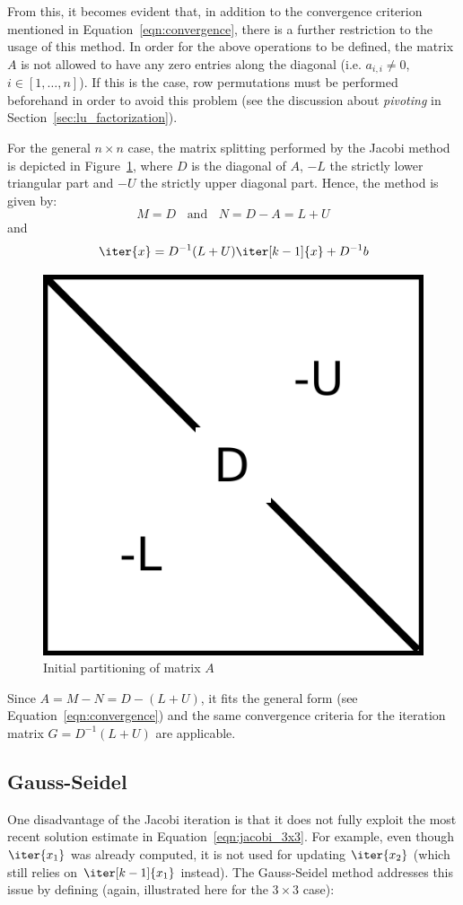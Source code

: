 \noindent From this, it becomes evident that, in addition to the convergence criterion mentioned in Equation~\hyperref[eqn:convergence]{\ref{eqn:convergence}}, there is a further restriction to the usage of this method. In order for the above operations to be defined, the matrix $A$ is not allowed to have any zero entries along the diagonal (i.e. $a_{i,i} \neq 0$, $i \in [1,\dots, n]$). If this is the case, row permutations must be performed beforehand in order to avoid this problem (see the discussion about \textit{pivoting} in Section~\hyperref[sec:lu_factorization]{\ref{sec:lu_factorization}}).

For the general $n \times n$ case, the matrix splitting performed by the Jacobi method is depicted in Figure~\hyperref[fig:splitting]{\ref{fig:splitting}}, where $D$ is the diagonal of $A$, $-L$ the strictly lower triangular part and $-U$ the strictly upper diagonal part. Hence, the method is given by:
\begin{equation}
    M=D \;\;\text{ and } \;\; N=D-A=L+U
\end{equation}
\noindent and
\begin{equation}
    \iter{x} = D^{-1}(L+U)\iter[k-1]{x} +D^{-1}b
\end{equation}

\begin{figure}[h]
    \centering
    \includegraphics[width=0.4\linewidth]{figures/Splitting.pdf}
    \caption[Matrix Splittings]{Initial partitioning of matrix $A$}
    \label{fig:splitting}
\end{figure}

\noindent Since $A = M -N = D - (L +U)$, it fits the general form (see Equation~\hyperref[eqn:convergence]{\ref{eqn:convergence}}) and the same convergence criteria for the iteration matrix $G=D^{-1}(L+U)$ are applicable.

\subsection{Gauss-Seidel}
One disadvantage of the Jacobi iteration is that it does not fully exploit the most recent solution estimate in Equation~\hyperref[eqn:jacobi_3x3]{\ref{eqn:jacobi_3x3}}. For example, even though $\iter{x_1}$ was already computed, it is not used for updating $\iter{x_2}$ (which still relies on $\iter[k-1]{x_1}$ instead). The Gauss-Seidel method addresses this issue by defining (again, illustrated here for the $3 \times 3$ case):

